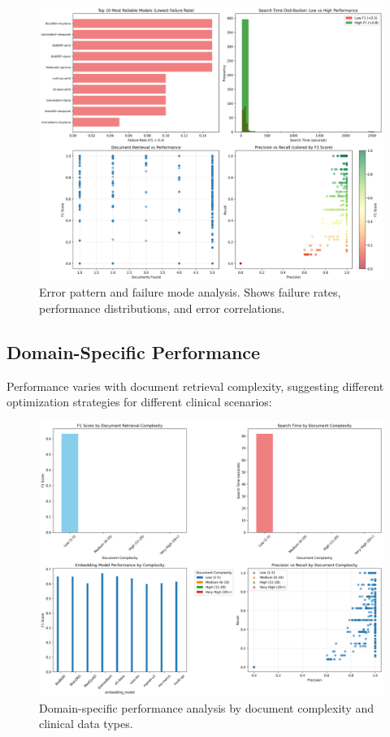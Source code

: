 \begin{figure}[!htbp]
  \centering
  \includegraphics[width=\textwidth]{chap4_results/images/error_pattern_analysis.png}
  \caption{Error pattern and failure mode analysis. Shows failure rates, performance distributions, and error correlations.}
  \label{fig:error_analysis}
\end{figure}

\subsection{Domain-Specific Performance}
Performance varies with document retrieval complexity, suggesting different optimization strategies for different clinical scenarios:

\begin{figure}[!htbp]
  \centering
  \includegraphics[width=\textwidth]{chap4_results/images/domain_specific_analysis.png}
  \caption{Domain-specific performance analysis by document complexity and clinical data types.}
  \label{fig:domain_analysis}
\end{figure}


